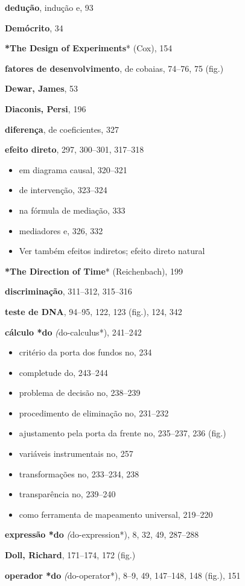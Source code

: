 \documentclass[11pt,a5paper,twoside]{book}
\begin{document}
\textbf{dedução}, indução e, 93

\textbf{Demócrito}, 34

\textbf{*The Design of Experiments}* (Cox), 154

\textbf{fatores de desenvolvimento}, de cobaias, 74–76, 75 (fig.)

\textbf{Dewar, James}, 53

\textbf{Diaconis, Persi}, 196

\textbf{diferença}, de coeficientes, 327

\textbf{efeito direto}, 297, 300–301, 317–318

\begin{itemize}
\item em diagrama causal, 320–321
\item de intervenção, 323–324
\item na fórmula de mediação, 333
\item mediadores e, 326, 332
\item Ver também efeitos indiretos; efeito direto natural
\end{itemize}
\textbf{*The Direction of Time}* (Reichenbach), 199

\textbf{discriminação}, 311–312, 315–316

\textbf{teste de DNA}, 94–95, 122, 123 (fig.), 124, 342

\textbf{cálculo *do}\textit{ (}do-calculus*), 241–242

\begin{itemize}
\item critério da porta dos fundos no, 234
\item completude do, 243–244
\item problema de decisão no, 238–239
\item procedimento de eliminação no, 231–232
\item ajustamento pela porta da frente no, 235–237, 236 (fig.)
\item variáveis instrumentais no, 257
\item transformações no, 233–234, 238
\item transparência no, 239–240
\item como ferramenta de mapeamento universal, 219–220
\end{itemize}
\textbf{expressão *do}\textit{ (}do-expression*), 8, 32, 49, 287–288

\textbf{Doll, Richard}, 171–174, 172 (fig.)

\textbf{operador *do}\textit{ (}do-operator*), 8–9, 49, 147–148, 148 (fig.), 151
\end{document}
